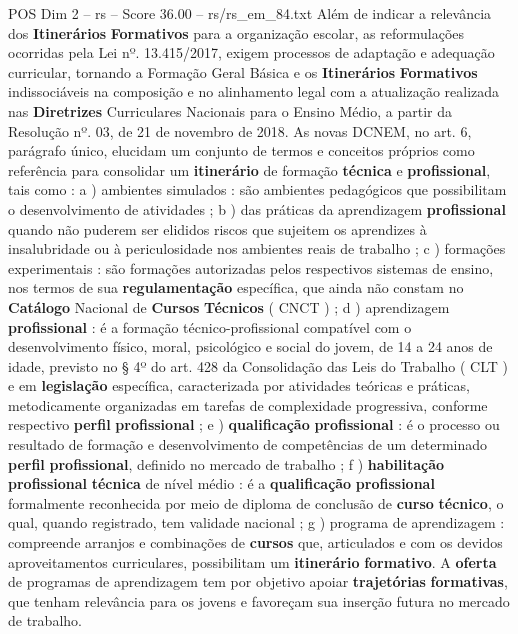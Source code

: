 \begin{textsample}{POS Dim 2 – rs – Score 36.00 – rs/rs\_em\_84.txt}
Além de indicar a relevância dos \textbf{Itinerários} \textbf{Formativos} para a organização escolar, as reformulações ocorridas pela Lei nº. 13.415/2017, exigem processos de adaptação e adequação curricular, tornando a Formação Geral Básica e os \textbf{Itinerários} \textbf{Formativos} indissociáveis na composição e no alinhamento legal com a atualização realizada nas \textbf{Diretrizes} Curriculares Nacionais para o Ensino Médio, a partir da Resolução nº. 03, de 21 de novembro de 2018.
As novas DCNEM, no art. 6, parágrafo único, elucidam um conjunto de termos e conceitos próprios como referência para consolidar um \textbf{itinerário} de formação \textbf{técnica} e \textbf{profissional}, tais como : a ) ambientes simulados : são ambientes pedagógicos que possibilitam o desenvolvimento de atividades ; b ) das práticas da aprendizagem \textbf{profissional} quando não puderem ser elididos riscos que sujeitem os aprendizes à insalubridade ou à periculosidade nos ambientes reais de trabalho ; c ) formações experimentais : são formações autorizadas pelos respectivos sistemas de ensino, nos termos de sua \textbf{regulamentação} específica, que ainda não constam no \textbf{Catálogo} Nacional de \textbf{Cursos} \textbf{Técnicos} ( CNCT ) ; d ) aprendizagem \textbf{profissional} : é a formação técnico-profissional compatível com o desenvolvimento físico, moral, psicológico e social do jovem, de 14 a 24 anos de idade, previsto no § 4º do art. 428 da Consolidação das Leis do Trabalho ( CLT ) e em \textbf{legislação} específica, caracterizada por atividades teóricas e práticas, metodicamente organizadas em tarefas de complexidade progressiva, conforme respectivo \textbf{perfil} \textbf{profissional} ; e ) \textbf{qualificação} \textbf{profissional} : é o processo ou resultado de formação e desenvolvimento de competências de um determinado \textbf{perfil} \textbf{profissional}, definido no mercado de trabalho ; f ) \textbf{habilitação} \textbf{profissional} \textbf{técnica} de nível médio : é a \textbf{qualificação} \textbf{profissional} formalmente reconhecida por meio de diploma de conclusão de \textbf{curso} \textbf{técnico}, o qual, quando registrado, tem validade nacional ; g ) programa de aprendizagem : compreende arranjos e combinações de \textbf{cursos} que, articulados e com os devidos aproveitamentos curriculares, possibilitam um \textbf{itinerário} \textbf{formativo}.
A \textbf{oferta} de programas de aprendizagem tem por objetivo apoiar \textbf{trajetórias} \textbf{formativas}, que tenham relevância para os jovens e favoreçam sua inserção futura no mercado de trabalho.

\end{textsample}
